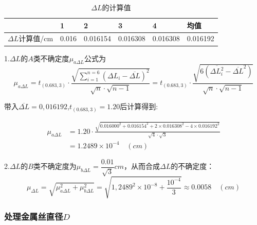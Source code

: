 \documentclass[UTF8]{article}
\begin{document}
\begin{table}[h]
\centering
\begin{tabular}{|l|l|l|l|l|l|}
	\hline
	& 1     & 2        & 3        & 4        & 均值       \\ \hline
	$\Delta L$计算值/cm & 0.016 & 0.016154 & 0.016308 & 0.016308 & 0.016192 \\ \hline
\end{tabular}
\caption{$\Delta L$的计算值}
\end{table}
\par 1.$\Delta L$的$A$类不确定度$\mu_{a\Delta L}$公式为
\[ \mu_{a\Delta L}=t_{(0.683,3)}\cdot\frac{\sqrt{\sum_{i=1}^{n=6}(\Delta L_i-\overline{\Delta L})^2}}{\sqrt{n}\cdot\sqrt{n-1}}=t_{(0.683,3)}\cdot\frac{\sqrt{6(\overline{\Delta L_i^2}-\overline{\Delta L }^2)}}{\sqrt{n}\cdot\sqrt{n-1}}\]
\clearpage
\par 带入$\overline{\Delta L}=0,016192$,\quad$t_{(0.683,3)}=1.20$后计算得到:

\begin{align*}
	\mu_{a\Delta L}&=1.20\cdot \frac{\sqrt{0.016000^2+0.016154^2+2\times0.016308^2-4\times0.016192^2}}{\sqrt{4}\cdot\sqrt{3}}\\
	&=1.2489\times10^{-4}  \quad (cm)     
\end{align*}
\par 2.$\Delta L$的$B$类不确定度为$\mu_{b\Delta L}=\dfrac{0.01}{\sqrt{3}}cm$，从而合成$\Delta L$的不确定度：
\[\mu_{\Delta L}=\sqrt{\mu_{a\Delta L}^2+\mu_{b\Delta L}^2}=\sqrt{1,2489^2\times 10^{-8}+\frac{10^{-4}}{3}}\approx 0.0058\quad(cm)\]

\subsubsection*{处理金属丝直径$D$}
\end{document}
